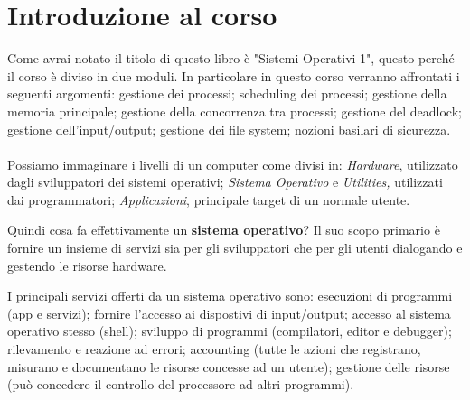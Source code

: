 \chapter{Introduzione al corso}

Come avrai notato il titolo di questo libro è "Sistemi Operativi 1", questo perché il corso è diviso in due moduli.
In particolare in questo corso verranno affrontati i seguenti argomenti: gestione dei processi; scheduling dei processi; gestione della memoria principale; gestione della concorrenza tra processi; gestione del deadlock; gestione dell'input/output; gestione dei file system; nozioni basilari di sicurezza.\\\\
Possiamo immaginare i livelli di un computer come divisi in: \textit{Hardware}, utilizzato dagli sviluppatori dei sistemi operativi; \textit{Sistema Operativo} e \textit{Utilities,} utilizzati dai programmatori; \textit{Applicazioni}, principale target di un normale utente.

\begin{redbar}
    Quindi cosa fa effettivamente un \textbf{sistema operativo}? Il suo scopo primario è fornire un insieme di servizi sia per gli sviluppatori che per gli utenti dialogando e gestendo le risorse hardware.    
\end{redbar}
I principali servizi offerti da un sistema operativo sono: esecuzioni di programmi (app e servizi); fornire l'accesso ai dispostivi di input/output; accesso al sistema operativo stesso (shell); sviluppo di programmi (compilatori, editor e debugger); rilevamento e reazione ad errori; accounting (tutte le azioni che registrano, misurano e documentano le risorse concesse ad un utente); gestione delle risorse (può concedere il controllo del processore ad altri programmi).

